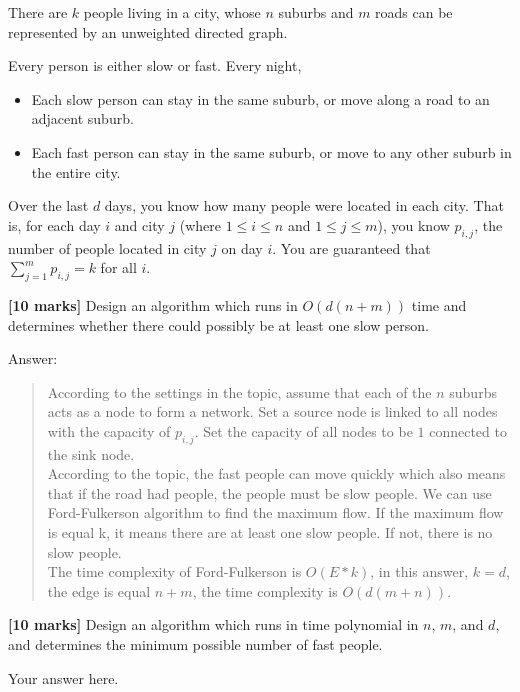 \documentclass{article}
\begin{document}
\setcounter{question}{1}

\begin{Question}
There are $k$ people living in a city, whose $n$ suburbs and $m$ roads can be represented by an unweighted directed graph.

Every person is either slow or fast. Every night,
\begin{itemize}
    \item Each slow person can stay in the same suburb, or move along a road to an adjacent suburb.
    \item Each fast person can stay in the same suburb, or move to any other suburb in the entire city.
\end{itemize}

Over the last $d$ days, you know how many people were located in each city. That is, for each day $i$ and city $j$ (where $1 \le i \le n$ and $1 \le j \le m$), you know $p_{i,j}$, the number of people located in city $j$ on day $i$. You are guaranteed that $\sum_{j=1}^m p_{i,j} = k$ for all $i$.

\begin{Subquestion}
\textbf{[10 marks]} Design an algorithm which runs in $O(d(n+m))$ time and determines whether there could possibly be at least one slow person.

\begin{answer}
Answer:
\begin{quote}
    According to the settings in the topic, assume that each of the $n$ suburbs acts as a node to form a network. Set a source node is linked to all nodes with the capacity of $p_{i,j}$. Set the capacity of all nodes to be $1$ connected to the sink node.\\

    According to the topic, the fast people can move quickly which also means that if the road had people, the people must be slow people.
    We can use Ford-Fulkerson algorithm to find the maximum flow. If the maximum flow is equal k, it means there are at least one slow people. If not, there is no slow people.\\
    
    The time complexity of Ford-Fulkerson is $O(E * k)$, in this answer, $k = d$, the edge is equal $n + m$, the time complexity is $O(d(m+n))$.\\
    
\end{quote}
\end{answer}
\end{Subquestion}

\begin{Subquestion}
\textbf{[10 marks]} Design an algorithm which runs in time polynomial in $n$, $m$, and $d$, and determines the minimum possible number of fast people.

\begin{answer}
Your answer here.
\end{answer}
\end{Subquestion}
\end{Question}
\end{document}
